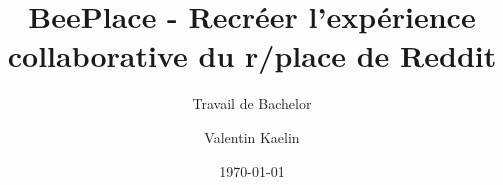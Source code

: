\author{Valentin Kaelin}


\title{BeePlace - Recréer l'expérience collaborative du r/place de Reddit}

\subtitle{Travail de Bachelor}


\date{\today}


